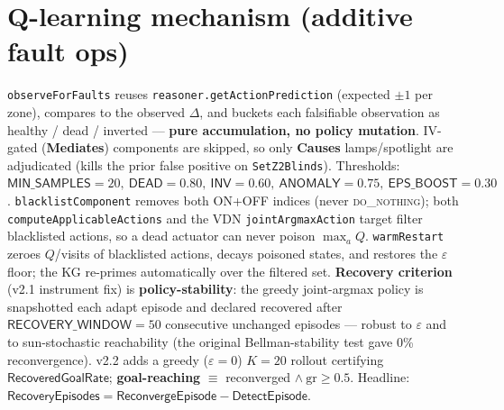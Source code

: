 \documentclass[10pt,a4paper]{article}
\newcommand{\file}[1]{\texttt{\small #1}}
\newcommand{\kw}[1]{\textbf{#1}}
\begin{document}
\begin{center}
\end{center}

\section{Q-learning mechanism (additive fault ops)}
\file{observeForFaults} reuses \file{reasoner.getActionPrediction} (expected \(\pm1\) per zone),
compares to the observed \(\Delta\), and buckets each falsifiable observation as healthy / dead / inverted —
\kw{pure accumulation, no policy mutation}. IV-gated (\kw{Mediates}) components are skipped, so only
\kw{Causes} lamps/spotlight are adjudicated (kills the prior false positive on \file{SetZ2Blinds}).
Thresholds: \(\textsf{MIN\_SAMPLES}=20,\ \textsf{DEAD}=0.80,\ \textsf{INV}=0.60,\ \textsf{ANOMALY}=0.75,\ \textsf{EPS\_BOOST}=0.30\).
\file{blacklistComponent} removes both ON+OFF indices (never \textsc{do\_nothing}); both
\file{computeApplicableActions} and the VDN \file{jointArgmaxAction} target filter blacklisted actions, so a
dead actuator can never poison \(\max_a Q\). \file{warmRestart} zeroes \(Q\)/visits of blacklisted actions,
decays poisoned states, and restores the \(\varepsilon\) floor; the KG re-primes automatically over the
filtered set. \kw{Recovery criterion} (v2.1 instrument fix) is \kw{policy-stability}: the greedy joint-argmax
policy is snapshotted each adapt episode and declared recovered after \(\textsf{RECOVERY\_WINDOW}=50\)
consecutive unchanged episodes — robust to \(\varepsilon\) and to sun-stochastic reachability (the original
Bellman-stability test gave 0\% reconvergence). v2.2 adds a greedy (\(\varepsilon{=}0\)) \(K{=}20\) rollout
certifying \(\textsf{RecoveredGoalRate}\); \kw{goal-reaching} \(\equiv\) reconverged \(\wedge\ \text{gr}\ge0.5\).
Headline: \(\textsf{RecoveryEpisodes}=\textsf{ReconvergeEpisode}-\textsf{DetectEpisode}\).
\end{document}
